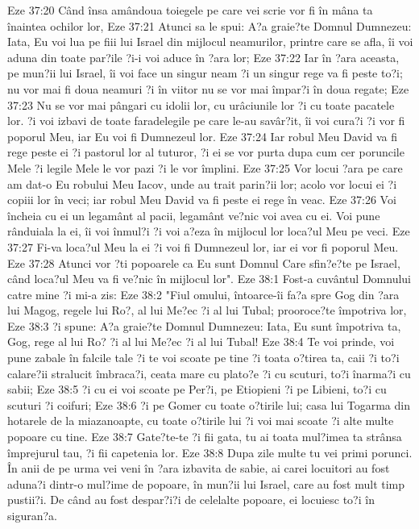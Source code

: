 Eze 37:20  Când însa amândoua toiegele pe care vei scrie vor fi în mâna ta înaintea ochilor lor,
Eze 37:21  Atunci sa le spui: A?a graie?te Domnul Dumnezeu: Iata, Eu voi lua pe fiii lui Israel din mijlocul neamurilor, printre care se afla, îi voi aduna din toate par?ile ?i-i voi aduce în ?ara lor;
Eze 37:22  Iar în ?ara aceasta, pe mun?ii lui Israel, îi voi face un singur neam ?i un singur rege va fi peste to?i; nu vor mai fi doua neamuri ?i în viitor nu se vor mai împar?i în doua regate;
Eze 37:23  Nu se vor mai pângari cu idolii lor, cu urâciunile lor ?i cu toate pacatele lor. ?i voi izbavi de toate faradelegile pe care le-au savâr?it, îi voi cura?i ?i vor fi poporul Meu, iar Eu voi fi Dumnezeul lor.
Eze 37:24  Iar robul Meu David va fi rege peste ei ?i pastorul lor al tuturor, ?i ei se vor purta dupa cum cer poruncile Mele ?i legile Mele le vor pazi ?i le vor împlini.
Eze 37:25  Vor locui ?ara pe care am dat-o Eu robului Meu Iacov, unde au trait parin?ii lor; acolo vor locui ei ?i copiii lor în veci; iar robul Meu David va fi peste ei rege în veac.
Eze 37:26  Voi încheia cu ei un legamânt al pacii, legamânt ve?nic voi avea cu ei. Voi pune rânduiala la ei, îi voi înmul?i ?i voi a?eza în mijlocul lor loca?ul Meu pe veci.
Eze 37:27  Fi-va loca?ul Meu la ei ?i voi fi Dumnezeul lor, iar ei vor fi poporul Meu.
Eze 37:28  Atunci vor ?ti popoarele ca Eu sunt Domnul Care sfin?e?te pe Israel, când loca?ul Meu va fi ve?nic în mijlocul lor".
Eze 38:1  Fost-a cuvântul Domnului catre mine ?i mi-a zis:
Eze 38:2  "Fiul omului, întoarce-îi fa?a spre Gog din ?ara lui Magog, regele lui Ro?, al lui Me?ec ?i al lui Tubal; prooroce?te împotriva lor,
Eze 38:3  ?i spune: A?a graie?te Domnul Dumnezeu: Iata, Eu sunt împotriva ta, Gog, rege al lui Ro? ?i al lui Me?ec ?i al lui Tubal!
Eze 38:4  Te voi prinde, voi pune zabale în falcile tale ?i te voi scoate pe tine ?i toata o?tirea ta, caii ?i to?i calare?ii stralucit îmbraca?i, ceata mare cu plato?e ?i cu scuturi, to?i înarma?i cu sabii;
Eze 38:5  ?i cu ei voi scoate pe Per?i, pe Etiopieni ?i pe Libieni, to?i cu scuturi ?i coifuri;
Eze 38:6  ?i pe Gomer cu toate o?tirile lui; casa lui Togarma din hotarele de la miazanoapte, cu toate o?tirile lui ?i voi mai scoate ?i alte multe popoare cu tine.
Eze 38:7  Gate?te-te ?i fii gata, tu ai toata mul?imea ta strânsa împrejurul tau, ?i fii capetenia lor.
Eze 38:8  Dupa zile multe tu vei primi porunci. În anii de pe urma vei veni în ?ara izbavita de sabie, ai carei locuitori au fost aduna?i dintr-o mul?ime de popoare, în mun?ii lui Israel, care au fost mult timp pustii?i. De când au fost despar?i?i de celelalte popoare, ei locuiesc to?i în siguran?a.
